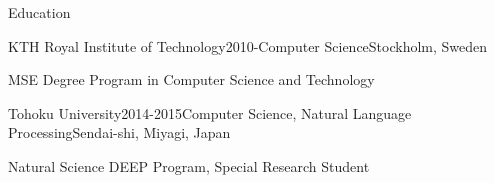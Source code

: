 \documentclass{resume} %
\begin{document}

\begin{rSection}{Education}

\begin{rSubsection}{KTH Royal Institute of Technology}{2010-}{Computer Science}{Stockholm, Sweden}
\item MSE Degree Program in Computer Science and Technology
\end{rSubsection}

\begin{rSubsection}{Tohoku University}{2014-2015}{Computer Science, Natural Language Processing}{Sendai-shi, Miyagi, Japan}
\item Natural Science DEEP Program, Special Research Student
\end{rSubsection}

\end{rSection}

\end{document}

